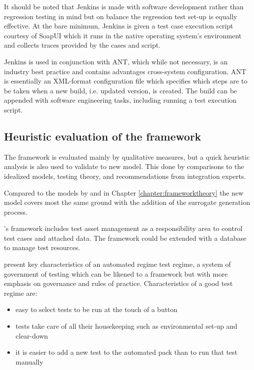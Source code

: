 \documentclass[12pt,a4paper,oneside,pdftex]{report}
\begin{document}
{It should be noted that Jenkins is made with software development rather than regression testing in mind but on balance the regression test set-up is equally effective. At the bare minimum, Jenkins is given a test case execution script courtesy of SoapUI which it runs in the native operating system's environment and collects traces provided by the cases and script.

Jenkins is used in conjunction with ANT, which while not necessary, is an industry best practice and contains advantages cross-system configuration. ANT is essentially an XML-format configuration file which specifies which steps are to be taken when a new build, i.e. updated version, is created. The build can be appended with software engineering tasks, including running a test execution script. 


\subsection{Heuristic evaluation of the framework}

The framework is evaluated mainly by qualitative measures, but a quick heuristic analysis is also used to validate to new model. This done by comparisons to the idealized models, testing theory, and recommendations from integration experts.

Compared to the models by \citet{liu2009unified} and \citet{huang2008surrogate} in Chapter \ref{chapter:frameworktheory} the new model covers most the same ground with the addition of the surrogate generation process. 

\citeauthor{laukkanen2006data}'s \citeyearpar{laukkanen2006data} framework includes test asset management as a responsibility area to control test cases and attached data. The framework could be extended with a database to manage test resources.

\citet{fewster1999software} present key characteristics of an automated regime test regime, a system of government of testing which can be likened to a framework but with more emphasis on governance and rules of practice. Characteristics of a good test regime are:
\begin{itemize}
\item easy to select tests to be run at the touch of a button
\item tests take care of all their housekeeping such as environmental set-up and clear-down
\item it is easier to add a new test to the automated pack than to run that test manually
\end{itemize}

}
\end{document}
